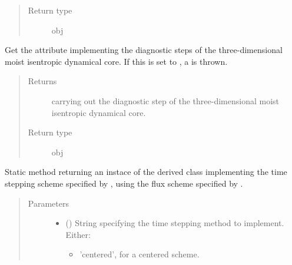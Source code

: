 \documentclass[letterpaper,10pt,english]{sphinxmanual}
\begin{document}
\begin{fulllineitems}
\begin{fulllineitems}
\begin{quote}
\begin{description}
\item[{Return type}] \leavevmode
obj

\end{description}\end{quote}

\end{fulllineitems}


\begin{fulllineitems}
\label{\detokenize{api:tasmania.dycore.prognostic_isentropic_nonconservative.PrognosticIsentropicNonconservative.diagnostic}}
Get the attribute implementing the diagnostic steps of the three-dimensional moist isentropic dynamical core.
If this is set to , a  is thrown.
\begin{quote}\begin{description}
\item[{Returns}] \leavevmode
{\hyperref[\detokenize{api:tasmania.dycore.diagnostic_isentropic.DiagnosticIsentropic}]{}} carrying out the diagnostic step of the
three-dimensional moist isentropic dynamical core.

\item[{Return type}] \leavevmode
obj

\end{description}\end{quote}

\end{fulllineitems}


\begin{fulllineitems}
\label{\detokenize{api:tasmania.dycore.prognostic_isentropic_nonconservative.PrognosticIsentropicNonconservative.factory}}
Static method returning an instace of the derived class implementing the time stepping scheme specified
by , using the flux scheme specified by .
\begin{quote}\begin{description}
\item[{Parameters}] \leavevmode\begin{itemize}
\item {} 
 () \textendash{} 
String specifying the time stepping method to implement. Either:
\begin{itemize}
\item {} 
’centered’, for a centered scheme.


\end{itemize}
\end{itemize}
\end{description}
\end{quote}
\end{fulllineitems}
\end{fulllineitems}
\end{document}
